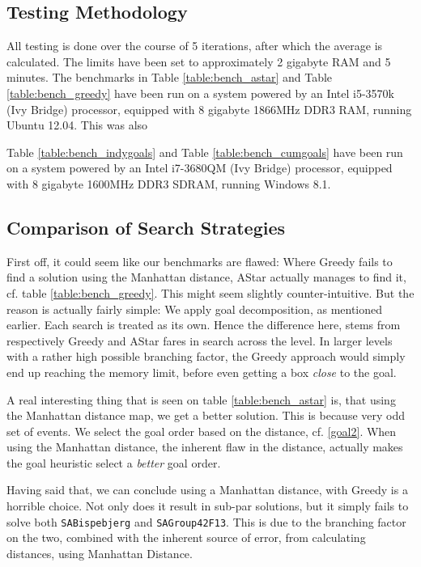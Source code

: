 \documentclass[letterpaper]{article}
\begin{document}
	\subsection{Testing Methodology}
		All testing is done over the course of 5 iterations, after which the average is calculated. The limits have been set to approximately 2 gigabyte RAM and 5 minutes. The benchmarks in Table \ref{table:bench_astar} and Table \ref{table:bench_greedy} have been run on a system powered by an Intel i5-3570k (Ivy Bridge) processor, equipped with 8 gigabyte 1866MHz DDR3 RAM, running Ubuntu 12.04. This was also 
		
		Table \ref{table:bench_indygoals} and Table \ref{table:bench_cumgoals} have been run on a system powered by an Intel i7-3680QM (Ivy Bridge) processor, equipped with 8 gigabyte 1600MHz DDR3 SDRAM, running Windows 8.1.

	\subsection{Comparison of Search Strategies}
		First off, it could seem like our benchmarks are flawed: Where Greedy fails to find a solution using the Manhattan distance, AStar actually manages to find it, cf. table \ref{table:bench_greedy}. This might seem slightly counter-intuitive. But the reason is actually fairly simple:  We apply goal decomposition, as mentioned earlier. Each search is treated as its own. Hence the difference here, stems from respectively Greedy and AStar fares in search across the level. In larger levels with a rather high possible branching factor, the Greedy approach would simply end up reaching the memory limit, before even getting a box \emph{close} to the goal.

		A real interesting thing that is seen on table \ref{table:bench_astar} is, that using the Manhattan distance map, we get a better solution. This is because very odd set of events. We select the goal order based on the distance, cf. \ref{goal2}. When using the Manhattan distance, the inherent flaw in the distance, actually makes the goal heuristic select a \emph{better} goal order.

		Having said that, we can conclude using a Manhattan distance, with Greedy is a horrible choice. Not only does it result in sub-par solutions, but it simply fails to solve both \verb=SABispebjerg= and \verb=SAGroup42F13=. This is due to the branching factor on the two, combined with the inherent source of error, from calculating distances, using Manhattan Distance. 
\end{document}
